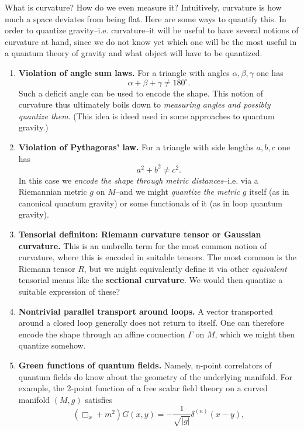 \begin{mytheorem}
%
What is curvature? How do we even measure it? Intuitively, curvature is how much a space deviates from being flat.
Here are some ways to quantify this. 
In order to quantize gravity--i.e. curvature--it will be useful to have several notions of curvature at hand, since we do not know yet which one will be the most useful in a quantum theory of gravity and what object will have to be quantized.
\begin{enumerate}
\item \textbf{Violation of angle sum laws.}  For a triangle with angles \(\alpha,\beta,\gamma\) one has
\[
\alpha + \beta + \gamma \neq 180^\circ.
\]
Such a deficit angle can be used to encode the shape. This notion of curvature thus ultimately boils down to \emph{measuring angles and possibly quantize them}. (This idea is ideed used in some approaches to quantum gravity.)
%
\item \textbf{Violation of Pythagoras' law.}  For a triangle with side lengths \(a,b,c\) one has
\[
a^2 + b^2 \neq c^2.
\]
In this case we \emph{encode the shape through metric distances}--i.e. via a Riemannian metric \(g\) on \(M\)--and we might \emph{quantize the metric} $g$ itself (as in canonical quantum gravity) or some functionals of it (as in loop quantum gravity).
%
\item \textbf{Tensorial definiton: Riemann curvature tensor or Gaussian curvature.} This is an umbrella term for the most common notion of curvature, where this is encoded in suitable tensors.
The most common is the Riemann tensor $R$, but we might equivalently define it via other \emph{equivalent} tensorial means like the \textbf{sectional curvature}.
We would then quantize a suitable expression of these?
%
\item \textbf{Nontrivial parallel transport around loops.}  A vector transported around a closed loop generally does not return to itself.  One can therefore encode the shape through an affine connection \(\Gamma\) on \(M\), which we might then quantize somehow.
%
\item \textbf{Green functions of quantum fields.} Namely, n-point correlators of quantum fields do know about the geometry of the underlying manifold.
For example, the 2-point function of a free scalar field theory on a curved manifold \((M,g)\) satisfies
\begin{equation}
    (\Box_x + m^2) G(x,y) = - \frac{1}{\sqrt{|g|}} \delta^{(n)} (x-y),
\end{equation}

\end{enumerate}
\end{mytheorem}
